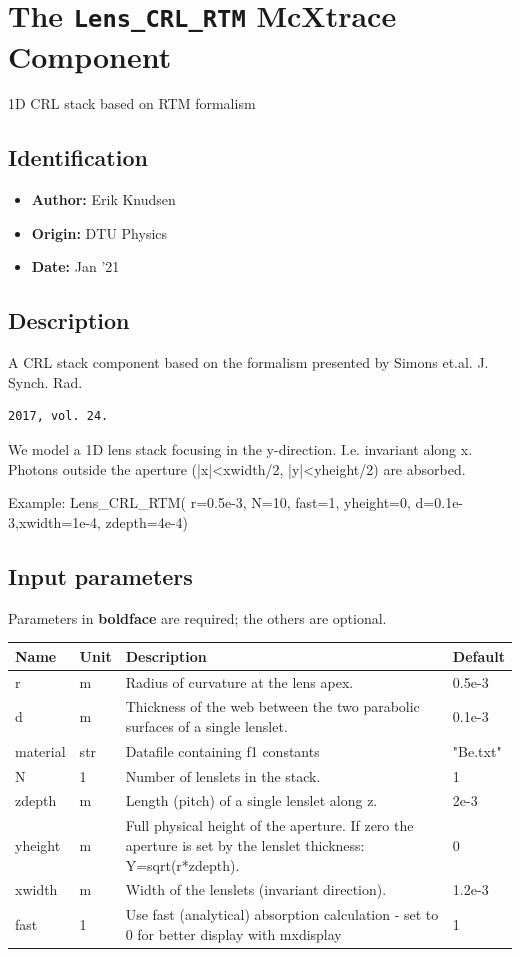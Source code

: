 \section{The \texttt{Lens\_CRL\_RTM} McXtrace Component}
1D CRL stack based on RTM formalism

\subsection*{Identification}
\begin{itemize}
  \item \textbf{Author:} Erik Knudsen
  \item \textbf{Origin:} DTU Physics
  \item \textbf{Date:} Jan '21
\end{itemize}

\subsection*{Description}
A CRL stack component based on the formalism presented by Simons et.al. J. Synch. Rad.

\begin{verbatim}
2017, vol. 24.
\end{verbatim}

We model a 1D lens stack focusing in the y-direction. I.e. invariant along x. Photons outside the aperture (|x|\textless{}xwidth/2, |y|\textless{}yheight/2) are absorbed.

Example: Lens\_CRL\_RTM( r=0.5e-3, N=10, fast=1, yheight=0, d=0.1e-3,xwidth=1e-4, zdepth=4e-4)

\subsection*{Input parameters}
Parameters in \textbf{boldface} are required; the others are optional.

\begin{longtable}{p{}p{}p{}p{}}
\toprule
\textbf{Name} & \textbf{Unit} & \textbf{Description} & \textbf{Default} \\
\midrule
\endhead
r & m & Radius of curvature at the lens apex. & 0.5e-3 \\
d & m & Thickness of the web between the two parabolic surfaces of a single lenslet. & 0.1e-3 \\
material & str & Datafile containing f1 constants & "Be.txt" \\
N & 1 & Number of lenslets in the stack. & 1 \\
zdepth & m & Length (pitch) of a single lenslet along z. & 2e-3 \\
yheight & m & Full physical height of the aperture. If zero the aperture is set by the lenslet thickness: Y=sqrt(r*zdepth). & 0 \\
xwidth & m & Width of the lenslets (invariant direction). & 1.2e-3 \\
fast & 1 & Use fast (analytical) absorption calculation - set to 0 for better display with mxdisplay & 1 \\
\bottomrule
\end{longtable}

